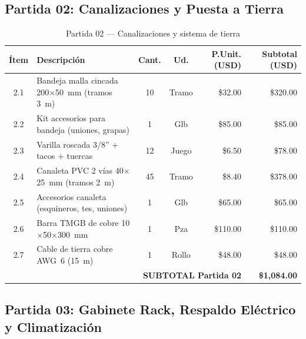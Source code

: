 \subsection{Partida 02: Canalizaciones y Puesta a Tierra}

\begin{table}[H]
\centering
\caption{Partida 02 --- Canalizaciones y sistema de tierra}
\small
\begin{tabularx}{\textwidth}{@{} c X c c r r @{}}
\toprule
\textbf{Ítem} & \textbf{Descripción} & \textbf{Cant.} & \textbf{Ud.} & \textbf{P.Unit. (USD)} & \textbf{Subtotal (USD)} \\
\midrule
2.1 & Bandeja malla cincada 200$\times$50~mm (tramos 3~m) & 10 & Tramo & \$32.00  & \$320.00 \\
2.2 & Kit accesorios para bandeja (uniones, grapas)        & 1  & Glb   & \$85.00  & \$85.00  \\
2.3 & Varilla roscada 3/8'' + tacos + tuercas              & 12 & Juego & \$6.50   & \$78.00  \\
2.4 & Canaleta PVC 2 vías 40$\times$25~mm (tramos 2~m)    & 45 & Tramo & \$8.40   & \$378.00 \\
2.5 & Accesorios canaleta (esquineros, tes, uniones)       & 1  & Glb   & \$65.00  & \$65.00  \\
2.6 & Barra TMGB de cobre 10$\times$50$\times$300~mm      & 1  & Pza   & \$110.00 & \$110.00 \\
2.7 & Cable de tierra cobre AWG~6 (15~m)                   & 1  & Rollo & \$48.00  & \$48.00  \\
\midrule
\multicolumn{5}{r}{\textbf{SUBTOTAL Partida 02}} & \textbf{\$1,084.00} \\
\bottomrule
\end{tabularx}
\label{tab:partida02}
\end{table}

\subsection{Partida 03: Gabinete Rack, Respaldo Eléctrico y Climatización}

